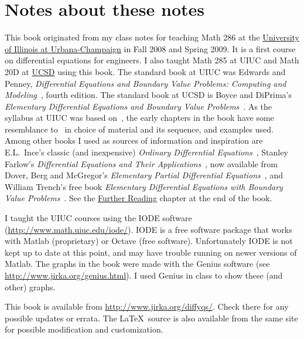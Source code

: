 \documentclass[12pt]{book}
\begin{document}

\section{Notes about these notes}
\label{notes:section}

This book originated from my class notes for teaching Math 286
at the \href{http://www.math.uiuc.edu/}{University of Illinois at
Urbana-Champaign}
in Fall 2008 and
Spring 2009.
It is a first course on differential equations for engineers.
I also taught Math 285 at UIUC
and Math 20D at \href{http://www.math.ucsd.edu/}{UCSD} using 
this book.
The standard book at UIUC was 
Edwards and Penney, \emph{Differential
Equations and Boundary Value Problems: Computing and Modeling}~\cite{EP},
fourth edition.
The standard book at UCSD is
Boyce and DiPrima's
\emph{Elementary
Differential Equations and Boundary Value Problems}~\cite{BD}.
As the syllabus at UIUC was based on~\cite{EP}, the early
chapters in the book have some resemblance to~\cite{EP} in choice of
material and its sequence, and examples used.
Among other books I used as sources of information and inspiration
are E.L.\ Ince's classic (and inexpensive)
\emph{Ordinary Differential Equations}~\cite{I},
Stanley Farlow's \emph{Differential Equations and Their
Applications}~\cite{F}, now available from Dover,
Berg and McGregor's
\emph{Elementary Partial Differential Equations}~\cite{BM},
and William Trench's free book
\emph{Elementary
Differential Equations with Boundary Value Problems}~\cite{T}.
See the \hyperref[furtherreading:chapter]{Further Reading} chapter at the end of the book.

I taught the UIUC courses using the IODE software
(\url{http://www.math.uiuc.edu/iode/}).  IODE is a free software package that
works with Matlab (proprietary) or Octave (free software).
Unfortunately IODE is not kept up to date at this point, and may have
trouble running on newer versions of Matlab.
The graphs in the book were made with
the Genius software
(see \url{http://www.jirka.org/genius.html}).  I used Genius
in class to show these (and other) graphs.

This book
is available from
\url{http://www.jirka.org/diffyqs/}.  Check there for any possible
updates or errata.  The \LaTeX\ source is also available from the same site
for possible modification and customization.
\end{document}

